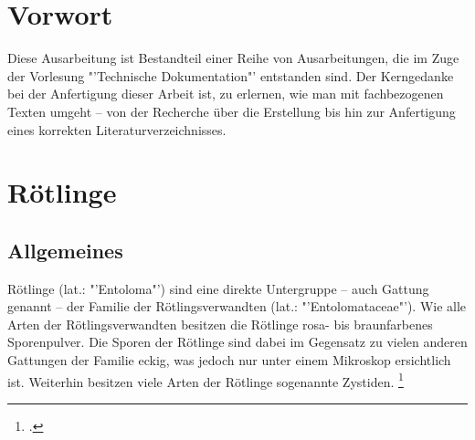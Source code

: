 \documentclass[a4paper,abstracton]{scrreprt}
\begin{document}


\tableofcontents
\pagebreak
\listoffigures

\begin{abstract}
\begin{quote}%
Unter dem Schirmthema \emph{Heimische Pilze} beschäftigt sich diese Ausarbeitung mit der Beschreibung einer Pilzgattung in der Ordnung der Champignonartigen, der Familie der Rötlingsverwandten, genauer den sogenannten \emph{Rötlingen -- lateinisch Entoloma --}. Es werden unter anderem Kenntnisse über Allgemeinheiten, das Vorkommen, die Beschreibung des Pilzes sowie die bei Pilzen so wichtigen Verwechslungsmöglichkeiten vermittelt. Weiterhin wird eine Auswahl ausgesuchter Arten einzeln betrachtet.
\end{quote} 
\end{abstract}

\chapter{Vorwort}
Diese Ausarbeitung ist Bestandteil einer Reihe von Ausarbeitungen, die im Zuge der Vorlesung "'Technische Dokumentation"' entstanden sind. Der Kerngedanke bei der Anfertigung dieser Arbeit ist, zu erlernen, wie man mit fachbezogenen Texten umgeht -- von der Recherche über die Erstellung bis hin zur Anfertigung eines korrekten Literaturverzeichnisses. 
\chapter{Rötlinge}
\section{Allgemeines}
Rötlinge (lat.: "'Entoloma"') sind eine direkte Untergruppe -- auch Gattung genannt -- der Familie der Rötlingsverwandten (lat.: "'Entolomataceae"'). Wie alle Arten der Rötlingsverwandten besitzen die Rötlinge rosa- bis braunfarbenes Sporenpulver. Die Sporen der Rötlinge sind dabei im Gegensatz zu vielen anderen Gattungen der Familie eckig, was jedoch nur unter einem Mikroskop ersichtlich ist. Weiterhin besitzen viele Arten der Rötlinge sogenannte Zystiden. \footcite{entoloma}
\end{document}
